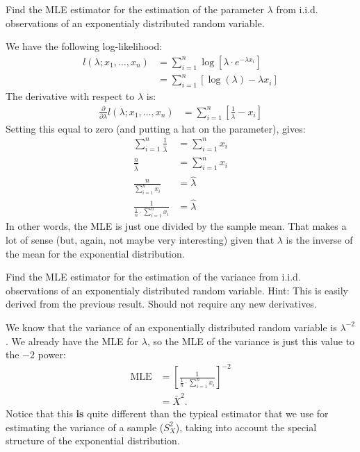 
Find the MLE estimator for the estimation of the parameter $\lambda$ from
i.i.d. observations of an exponentialy distributed random variable.


We have the following log-likelihood:
\begin{align*}
l(\lambda; x_1, \ldots, x_n) &= \sum_{i=1}^n \log\left[ \lambda \cdot e^{-\lambda x_i} \right] \\
&= \sum_{i=1}^n \left[\log(\lambda) - \lambda x_i \right]
\end{align*}
The derivative with respect to $\lambda$ is:
\begin{align*}
\frac{\partial}{\partial \lambda} l(\lambda; x_1, \ldots, x_n)
&= \sum_{i=1}^n \left[ \frac{1}{\lambda} - x_i \right] 
\end{align*}
Setting this equal to zero (and putting a hat on the parameter), gives:
\begin{align*}
\sum_{i=1}^n \frac{1}{\hat{\lambda}} &= \sum_{i=1}^n x_i \\
\frac{n}{\hat{\lambda}} &= \sum_{i=1}^n x_i \\
\frac{n}{\sum_{i=1}^n x_i} &= \hat{\lambda} \\
\frac{1}{\frac{1}{n} \cdot \sum_{i=1}^n x_i} &= \hat{\lambda} 
\end{align*}
In other words, the MLE is just one divided by the sample mean. That makes
a lot of sense (but, again, not maybe very interesting) given that $\lambda$
is the inverse of the mean for the exponential distribution.


Find the MLE estimator for the estimation of the variance from
i.i.d. observations of an exponentialy distributed random variable.
Hint: This is easily derived from the previous result. Should not 
require any new derivatives.


We know that the variance of an exponentially distributed random variable
is $\lambda^{-2}$. We already have the MLE for $\lambda$, so the MLE of the
variance is just this value to the $-2$ power:
\begin{align*}
\text{MLE} &= \left[ \frac{1}{\frac{1}{n} \cdot \sum_{i=1}^n x_i} \right]^{-2} \\
&= \bar{X}^{2}.
\end{align*}
Notice that this \textbf{is} quite different than the typical estimator that
we use for estimating the variance of a sample ($S_X^2$), taking into account
the special structure of the exponential distribution.


